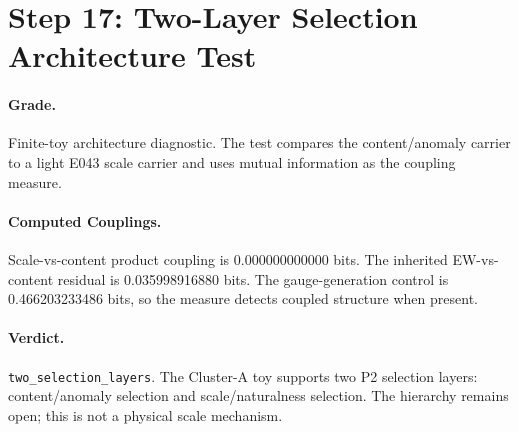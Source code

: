 \section{Step 17: Two-Layer Selection Architecture Test}

\paragraph{Grade.}
Finite-toy architecture diagnostic. The test compares the content/anomaly carrier to a light E043 scale carrier and uses mutual information as the coupling measure.

\paragraph{Computed Couplings.}
Scale-vs-content product coupling is 0.000000000000 bits. The inherited EW-vs-content residual is 0.035998916880 bits. The gauge-generation control is 0.466203233486 bits, so the measure detects coupled structure when present.

\paragraph{Verdict.}
\texttt{two_selection_layers}. The Cluster-A toy supports two P2 selection layers: content/anomaly selection and scale/naturalness selection. The hierarchy remains open; this is not a physical scale mechanism.
